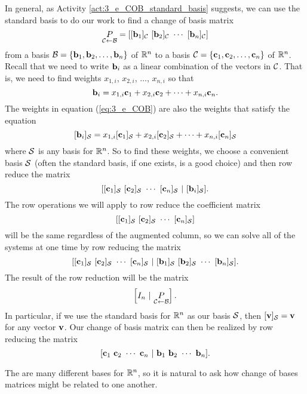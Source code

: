 In general, as Activity \ref{act:3_e_COB_standard_basis} suggests, we can use the standard basis to do our work to find a change of basis matrix 
\[\underset{\CC \leftarrow \CB}{P} = [[\vb_1]_{\CC} \ [\vb_2]_{\CC}  \  \cdots  \ [\vb_n]_{\CC}]\]
from a basis $\mathcal{B} = \{\mathbf{b}_1, \mathbf{b}_2, \ldots, \mathbf{b}_n\}$ of $\mathbb{R}^n$ to a basis $\mathcal{C} = \{\mathbf{c}_1, \mathbf{c}_2, \ldots, \mathbf{c}_n\}$ of $\mathbb{R}^n$. Recall that we need to write $\mathbf{b}_i$ as a linear combination of the vectors in $\mathcal{C}$. That is, we need to find weights $x_{1,i}$, $x_{2,i}$, $\ldots$, $x_{n,i}$ so that 
\begin{equation} \label{eq:3_e_COB} 
\mathbf{b}_i = x_{1,i}\mathbf{c}_1 + x_{2,i} \mathbf{c}_2 + \cdots + x_{n,i} \mathbf{c}_n.
\end{equation}
The weights in equation (\ref{eq:3_e_COB}) are also the weights that satisfy the equation
\[[\mathbf{b}_i]_{\mathcal{S}} = x_{1,i}[\mathbf{c}_1]_{\mathcal{S}} + x_{2,i} [\mathbf{c}_2]_{\mathcal{S}} + \cdots + x_{n,i} [\mathbf{c}_n]_{\mathcal{S}}\]
where $\mathcal{S}$ is any basis for $\mathbb{R}^n$. So to find these weights, we choose a convenient basis $\mathcal{S}$ (often the standard basis, if one exists, is a good choice) and then row reduce the matrix 
\[[[\vc_1]_{\CS} \ [\vc_2]_{\CS} \ \cdots \ [\vc_n]_{\CS} \ | \ [\vb_i]_{\CS}].\]
The row operations we will apply to row reduce the coefficient matrix 
\[[[\vc_1]_{\CS} \ [\vc_2]_{\CS} \ \cdots \ [\vc_n]_{\CS}]\]
will be the same regardless of the augmented column, so we can solve all of the systems at one time by row reducing the matrix 
\[[[\vc_1]_{\CS} \ [\vc_2]_{\CS} \ \cdots \ [\vc_n]_{\CS} \ | \ [\vb_1]_{\CS} \ [\vb_2]_{\CS} \ \cdots \ [\vb_n]_{\CS}].\]
The result of the row reduction will be the matrix 
\[\left[ I_n \ | \ \underset{\mathcal{C} \leftarrow \mathcal{B}}{P} \right].\]
In particular, if we use the standard basis for $\mathbb{R}^n$ as our basis $\mathcal{S}$, then $[\mathbf{v}]_{\mathcal{S}} = \mathbf{v}$ for any vector $\mathbf{v}$. Our change of basis matrix can then be realized by row reducing the matrix
\[[\vc_1 \ \vc_2 \ \cdots \ \vc_n \ | \ \vb_1 \ \vb_2 \ \cdots \ \vb_n].\]



The are many different bases for $\mathbb{R}^n$, so it is natural to ask how change of bases matrices might be related to one another.

